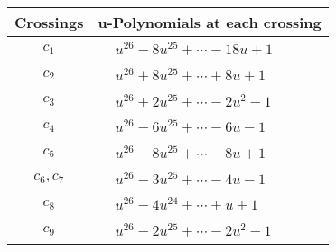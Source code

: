 \documentclass[1p]{elsarticle_modified}
\theoremstyle{definition}
\begin{document}
\begin{tabular}{m{50pt}|m{274pt}}
Crossings & \hspace{64pt}u-Polynomials at each crossing \\
\hline $$\begin{aligned}c_{1}\end{aligned}$$&$\begin{aligned}
&u^{26}-8 u^{25}+\cdots-18 u+1
\end{aligned}$\\
\hline $$\begin{aligned}c_{2}\end{aligned}$$&$\begin{aligned}
&u^{26}+8 u^{25}+\cdots+8 u+1
\end{aligned}$\\
\hline $$\begin{aligned}c_{3}\end{aligned}$$&$\begin{aligned}
&u^{26}+2 u^{25}+\cdots-2 u^2-1
\end{aligned}$\\
\hline $$\begin{aligned}c_{4}\end{aligned}$$&$\begin{aligned}
&u^{26}-6 u^{25}+\cdots-6 u-1
\end{aligned}$\\
\hline $$\begin{aligned}c_{5}\end{aligned}$$&$\begin{aligned}
&u^{26}-8 u^{25}+\cdots-8 u+1
\end{aligned}$\\
\hline $$\begin{aligned}c_{6},c_{7}\end{aligned}$$&$\begin{aligned}
&u^{26}-3 u^{25}+\cdots-4 u-1
\end{aligned}$\\
\hline $$\begin{aligned}c_{8}\end{aligned}$$&$\begin{aligned}
&u^{26}-4 u^{24}+\cdots+u+1
\end{aligned}$\\
\hline $$\begin{aligned}c_{9}\end{aligned}$$&$\begin{aligned}
&u^{26}-2 u^{25}+\cdots-2 u^2-1
\end{aligned}$\\

\end{tabular}
\end{document}
